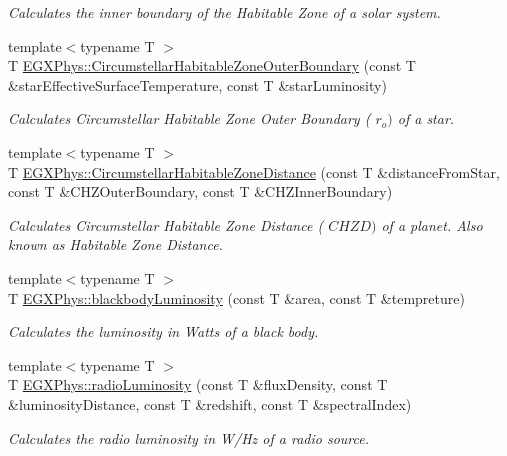\begin{DoxyCompactItemize}
\begin{DoxyCompactList}\small\item\em Calculates the inner boundary of the Habitable Zone of a solar system. \end{DoxyCompactList}\item 
{\footnotesize template$<$typename T $>$ }\\T \hyperlink{group___astrophysics_gaa47fcde814ba8007de800e930fc0a08d}{E\+G\+X\+Phys\+::\+Circumstellar\+Habitable\+Zone\+Outer\+Boundary} (const T \&star\+Effective\+Surface\+Temperature, const T \&star\+Luminosity)
\begin{DoxyCompactList}\small\item\em Calculates Circumstellar Habitable Zone Outer Boundary ( $r_o)$ of a star. \end{DoxyCompactList}\item 
{\footnotesize template$<$typename T $>$ }\\T \hyperlink{group___astrophysics_gacf3a720793cdb27f6d93b170b44e81be}{E\+G\+X\+Phys\+::\+Circumstellar\+Habitable\+Zone\+Distance} (const T \&distance\+From\+Star, const T \&C\+H\+Z\+Outer\+Boundary, const T \&C\+H\+Z\+Inner\+Boundary)
\begin{DoxyCompactList}\small\item\em Calculates Circumstellar Habitable Zone Distance ( $CHZD)$ of a planet. Also known as Habitable Zone Distance. \end{DoxyCompactList}\item 
{\footnotesize template$<$typename T $>$ }\\T \hyperlink{group___astrophysics_ga909f82edfaed449b44e94788b642ebb8}{E\+G\+X\+Phys\+::blackbody\+Luminosity} (const T \&area, const T \&tempreture)
\begin{DoxyCompactList}\small\item\em Calculates the luminosity in Watts of a black body. \end{DoxyCompactList}\item 
{\footnotesize template$<$typename T $>$ }\\T \hyperlink{group___astrophysics_ga6d6865b2aac1bc7c7f06b7c4ac2444e4}{E\+G\+X\+Phys\+::radio\+Luminosity} (const T \&flux\+Density, const T \&luminosity\+Distance, const T \&redshift, const T \&spectral\+Index)
\begin{DoxyCompactList}\small\item\em Calculates the radio luminosity in W/\+Hz of a radio source. \end{DoxyCompactList}\item 

\end{DoxyCompactItemize}
